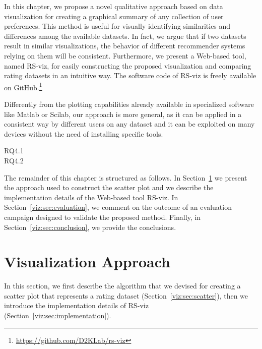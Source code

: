 In this chapter, we propose a novel qualitative approach based on data visualization for creating a graphical summary of any collection of user preferences. This method is useful for visually identifying similarities and differences among the available datasets. In fact, we argue that if two datasets result in similar visualizations, the behavior of different recommender systems relying on them will be consistent. Furthermore, we present a Web-based tool, named RS-viz, for easily constructing the proposed visualization and comparing rating datasets in an intuitive way. The software code of RS-viz is freely available on GitHub.\footnote{\url{https://github.com/D2KLab/rs-viz}}

Differently from the plotting capabilities already available in specialized software like Matlab or Scilab, our approach is more general, as it can be applied in a consistent way by different users on any dataset and it can be exploited on many devices without the need of installing specific tools.


\begin{description}
\item[RQ4.1\label{viz:itm:rq1}] 
\item[RQ4.2\label{viz:itm:rq2}] 
\end{description}

The remainder of this chapter is structured as follows. In Section~\ref{viz:sec:visualization} we present the approach used to construct the scatter plot and we describe the implementation details of the Web-based tool RS-viz. In Section~\ref{viz:sec:evaluation}, we comment on the outcome of an evaluation campaign designed to validate the proposed method. Finally, in Section~\ref{viz:sec:conclusion}, we provide the conclusions.

\section{Visualization Approach}
\label{viz:sec:visualization}

In this section, we first describe the algorithm that we devised  for creating a scatter plot that represents a rating dataset (Section~\ref{viz:sec:scatter}), then we introduce the implementation details of RS-viz (Section~\ref{viz:sec:implementation}).

